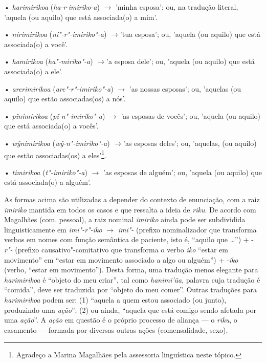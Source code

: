 • \emph{harimirikoa} (\emph{ha}-\emph{r}-\emph{imiriko}-\emph{a}) $\rightarrow$
'minha esposa'; ou, na tradução literal, 'aquela (ou aquilo) que está
associada(o) a mim'.

• \emph{nirimirikoa} (\emph{ni"-r"-imiriko"-a}) $\rightarrow$'tua esposa'; ou, 'aquela
(ou aquilo) que está associada(o) a você'.

• \emph{hamirikoa} (\emph{ha"-miriko"-a}) $\rightarrow$'a esposa dele'; ou, 'aquela
(ou aquilo) que está associada(o) a ele'.

• \emph{arerimirikoa} (\emph{are"-r"-imiriko"-a}) $\rightarrow$ 'as nossas esposas';
ou, 'aquelas (ou aquilo) que estão associadas(os) a nós'.

• \emph{pĩnimirikoa} (\emph{pĩ-n"-imiriko"-a}) $\rightarrow$ 'as esposas de vocês';
ou, 'aquela (ou aquilo) que está associada(o) a vocês'.

• \emph{wỹnimirikoa} (\emph{wỹ-n"-imiriko"-a}) $\rightarrow$'as esposas deles'; ou,
'aquelas, (ou aquilo) que estão associadas(os) a eles'\footnote{Agradeço
  a Marina Magalhães pela assessoria linguística neste tópico.}.

• \emph{timirikoa} (\emph{t"-imiriko"-a}) $\rightarrow$ 'as esposas de alguém'; ou,
'aquela (ou aquilo) que está associada(o) a alguém'.

As formas acima são utilizadas a depender do contexto de enunciação, com
a raiz \emph{imiriko} mantida em todos os casos e que ressalta a ideia
de \emph{riku}. De acordo com Magalhães (com. pessoal), a raiz nominal
\emph{imiriko} ainda pode ser subdividida linguisticamente em
\emph{{imi"-r"-iko}} $\rightarrow$ \emph{imi"-} (prefixo nominalizador que transforma
verbos em nomes com função semântica de paciente, isto é, ``aquilo que
\ldots{}'') + -\emph{r"-} (prefixo causativo"-comitativo que transforma o verbo
\emph{iko} ``estar em movimento'' em ``estar em movimento associado a algo
ou alguém'') + -\emph{iko} (verbo, ``estar em movimento''). Desta forma,
uma tradução menos elegante para \emph{harimirikoa} é ``objeto do meu
criar'', tal como \emph{hanimi'ũa}, palavra cuja tradução é ``comida'',
deve ser traduzida por ``objeto do meu comer''. Outras traduções para
\emph{harimirikoa} podem ser: (1) ``aquela a quem estou associado (ou
junto), produzindo uma \emph{ação}''; (2) ou ainda, ``aquela que está
comigo sendo afetada por uma \emph{ação}''. A \emph{ação} em questão é o
próprio processo de aliança --- o \emph{riku}, o casamento --- formada por
diversas outras ações (comensalidade, sexo).

